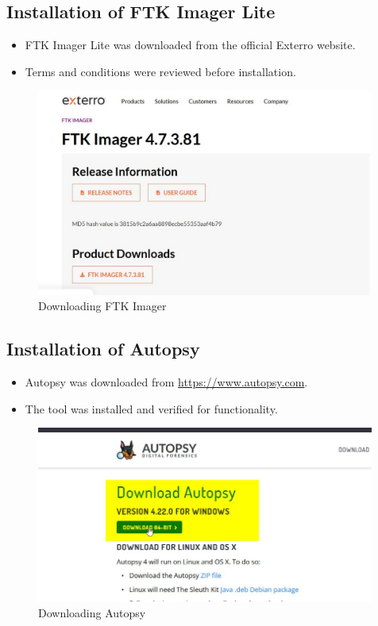\documentclass[11pt]{article}
\begin{document}
\subsection{Installation of FTK Imager Lite}
\begin{itemize}
    \item FTK Imager Lite was downloaded from the official Exterro website.
    \item Terms and conditions were reviewed before installation.
\end{itemize}
\begin{figure}[H]
    \centering
    \includegraphics[width=0.99\textwidth]{ftk.jpg}
    \caption{Downloading FTK Imager}
    \label{fig:1}
\end{figure}

\subsection{Installation of Autopsy}
\begin{itemize}
    \item Autopsy was downloaded from \href{https://www.autopsy.com}{https://www.autopsy.com}.
    \item The tool was installed and verified for functionality.
\end{itemize}
\begin{figure}[H]
    \centering
    \includegraphics[width=0.99\textwidth]{autopsy.jpg}
    \caption{Downloading Autopsy}
    \label{fig:1}
\end{figure}
\end{document}
